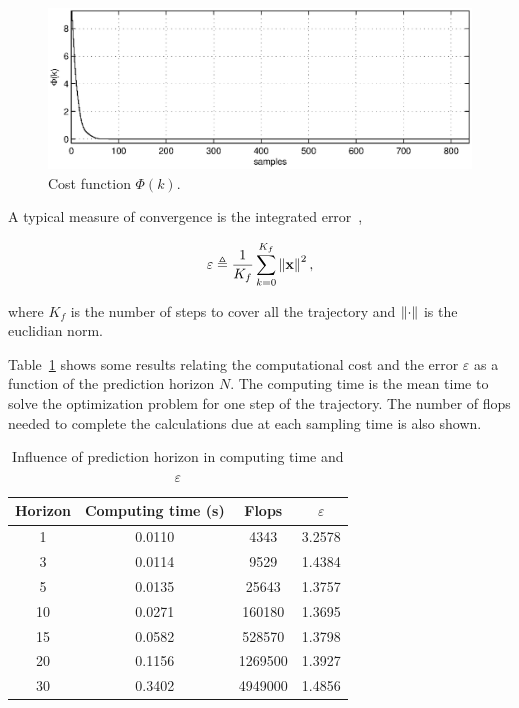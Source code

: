 \documentclass[conference]{IEEEtran} %
\begin{document}
\begin{figure}[htbp]
	\centering
    \includegraphics[width=.95\linewidth]{Figures/cost.eps}
    \caption{Cost function $\Phi(k)$.}
    \label{fig:cost}
\end{figure}

A typical measure of convergence is the integrated error~\cite{essen01},

\begin{equation*}
	\varepsilon \triangleq \frac{1}{K_f}\sum_{k=0}^{K_f}\left\|{\bf x}\right\|^2,
\end{equation*}

\noindent where $K_f$ is the number of steps to cover all the trajectory and
$\left\|{\bf\cdot}\right\|$ is the euclidian norm.

Table~\ref{table:table1} shows some results relating the computational cost
and the error $\varepsilon$ as a function of the prediction horizon $N$.
The computing time is the mean time to solve the optimization problem
for one step of the trajectory. The number of flops needed to complete the
calculations due at each sampling time is also shown.
 
\begin{table}[htpb]
 \caption{Influence of prediction horizon in computing time and $\varepsilon$}
 \label{table:table1}
 \centering
 \begin{tabular}{cccc}
  \hline
  Horizon & Computing time (s) & Flops & $\varepsilon$ \\
  \hline\hline
  1  & 0.0110 & 4343    & 3.2578  \\
  3  & 0.0114 & 9529    & 1.4384  \\
  5  & 0.0135 & 25643   & 1.3757  \\
  10 & 0.0271 & 160180  & 1.3695  \\
  15 & 0.0582 & 528570  & 1.3798  \\
  20 & 0.1156 & 1269500 & 1.3927  \\
  30 & 0.3402 & 4949000 & 1.4856  \\
  \hline
 \end{tabular}
\end{table}
 
\end{document}

